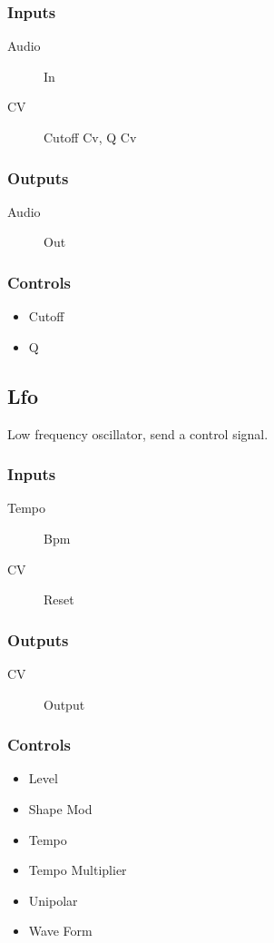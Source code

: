 \subsubsection{Inputs}
\begin{description}
\item [Audio] In
\item [CV] Cutoff Cv, Q Cv
\end{description}

\subsubsection{Outputs}
\begin{description}
\item [Audio] Out
\end{description}

\subsubsection{Controls}
\begin{itemize}
\item Cutoff
\item Q
\end{itemize}

\subsection{Lfo}

Low frequency oscillator, send a control signal.



\subsubsection{Inputs}
\begin{description}
\item [Tempo] Bpm
\item [CV] Reset
\end{description}

\subsubsection{Outputs}
\begin{description}
\item [CV] Output
\end{description}

\subsubsection{Controls}
\begin{itemize}
\item Level
\item Shape Mod
\item Tempo
\item Tempo Multiplier
\item Unipolar
\item Wave Form
\end{itemize}

